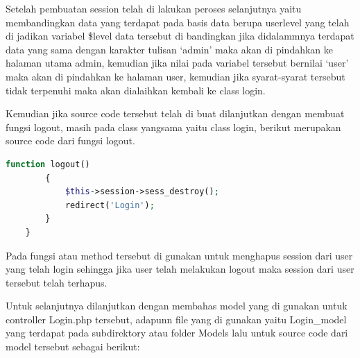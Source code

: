 	Setelah pembuatan session telah di lakukan peroses selanjutnya yaitu membandingkan data yang terdapat pada basis data berupa userlevel yang telah di jadikan variabel \$level data tersebut di bandingkan jika didalammnya terdapat data yang sama dengan karakter tulisan ‘admin’ maka akan di pindahkan ke halaman utama admin, kemudian jika nilai pada variabel tersebut bernilai ‘user’ maka akan di pindahkan ke halaman user, kemudian jika syarat-syarat tersebut tidak terpenuhi maka akan dialaihkan kembali ke class login.\par
	Kemudian jika source code tersebut telah di buat dilanjutkan dengan membuat fungsi logout, masih pada class yangsama yaitu class login, berikut merupakan source code dari fungsi logout.
\begin{lstlisting}[language=PHP]
	function logout()  
	    {  
	        $this->session->sess_destroy();  
	        redirect('Login');  
	    }  
	}  
\end{lstlisting}

Pada fungsi atau method tersebut di gunakan untuk menghapus session dari user yang telah login sehingga jika user telah melakukan logout maka session dari user tersebut telah terhapus.\par
Untuk selanjutnya dilanjutkan dengan membahas model yang di gunakan untuk controller Login.php tersebut, adapunn file yang di gunakan yaitu Login\_model yang terdapat pada subdirektory atau folder Models lalu untuk source code dari model tersebut sebagai berikut:\par

